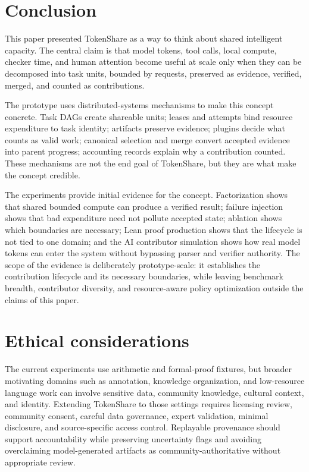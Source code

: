 \documentclass{article}
\theoremstyle{plain}
\begin{document}
\section{Conclusion}

{\color{blue}
This paper presented TokenShare as a way to think about shared intelligent capacity. The central claim is that model tokens, tool calls, local compute, checker time, and human attention become useful at scale only when they can be decomposed into task units, bounded by requests, preserved as evidence, verified, merged, and counted as contributions.

The prototype uses distributed-systems mechanisms to make this concept concrete. Task DAGs create shareable units; leases and attempts bind resource expenditure to task identity; artifacts preserve evidence; plugins decide what counts as valid work; canonical selection and merge convert accepted evidence into parent progress; accounting records explain why a contribution counted. These mechanisms are not the end goal of TokenShare, but they are what make the concept credible.

The experiments provide initial evidence for the concept. Factorization shows that shared bounded compute can produce a verified result; failure injection shows that bad expenditure need not pollute accepted state; ablation shows which boundaries are necessary; Lean proof production shows that the lifecycle is not tied to one domain; and the AI contributor simulation shows how real model tokens can enter the system without bypassing parser and verifier authority. The scope of the evidence is deliberately prototype-scale: it establishes the contribution lifecycle and its necessary boundaries, while leaving benchmark breadth, contributor diversity, and resource-aware policy optimization outside the claims of this paper.
}


\section*{Ethical considerations}

{\color{blue}
The current experiments use arithmetic and formal-proof fixtures, but broader motivating domains such as annotation, knowledge organization, and low-resource language work can involve sensitive data, community knowledge, cultural context, and identity. Extending TokenShare to those settings requires licensing review, community consent, careful data governance, expert validation, minimal disclosure, and source-specific access control. Replayable provenance should support accountability while preserving uncertainty flags and avoiding overclaiming model-generated artifacts as community-authoritative without appropriate review.
}





\end{document}
